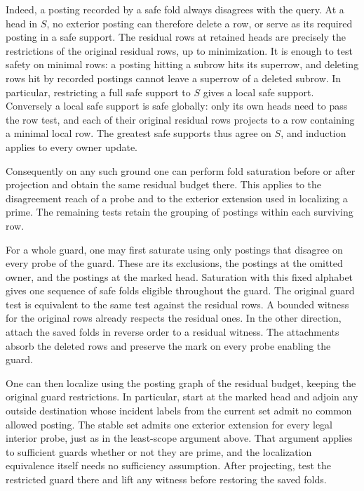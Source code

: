 Indeed, a posting recorded by a safe fold always
disagrees with the query. At a head in $S$, no
exterior posting can therefore delete a row, or
serve as its required posting in a safe support.
The residual rows at retained heads are precisely
the restrictions of the original residual rows,
up to minimization. It is enough to test safety on
minimal rows: a posting hitting a subrow hits its
superrow, and deleting rows hit by recorded
postings cannot leave a superrow of a deleted
subrow. In particular, restricting a full safe
support to $S$ gives a local safe support.
Conversely a local safe support is safe globally:
only its own heads need to pass the row test, and
each of their original residual rows projects to
a row containing a minimal local row. The greatest
safe supports thus agree on $S$, and induction
applies to every owner update.

Consequently on any such ground one can perform
fold saturation before or after projection and
obtain the same residual budget there. This
applies to the disagreement reach of a probe and
to the exterior extension used in localizing a
prime. The remaining tests retain the grouping of
postings within each surviving row.

For a whole guard, one may first saturate using
only postings that disagree on every probe of
the guard. These are its exclusions, the postings
at the omitted owner, and the postings at the
marked head. Saturation with this fixed alphabet
gives one sequence of safe folds eligible
throughout the guard. The original guard test is
equivalent to the same test against the residual
rows. A bounded witness for the original rows
already respects the residual ones. In the
other direction, attach the saved folds in
reverse order to a residual witness. The
attachments absorb the deleted rows and preserve
the mark on every probe enabling the guard.

One can then localize using the posting graph
of the residual budget, keeping the original
guard restrictions. In particular, start at the
marked head and adjoin any outside destination
whose incident labels from the current set admit
no common allowed posting. The stable set admits
one exterior extension for every legal interior
probe, just as in the least-scope argument above.
That argument applies to sufficient guards
whether or not they are prime, and the
localization equivalence itself needs no
sufficiency assumption. After projecting,
test the restricted guard there and lift any
witness before restoring the saved folds.

